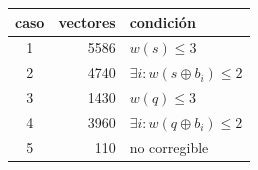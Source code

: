\begin{tabular}{@{}crl@{}}
\toprule
caso & vectores & condición \\
\midrule
1 & 5586 & $w(s)\le 3$ \\
2 & 4740 & $\exists i: w(s\oplus b_i)\le 2$ \\
3 & 1430 & $w(q)\le 3$ \\
4 & 3960 & $\exists i: w(q\oplus b_i)\le 2$ \\
5 & 110 & no corregible \\
\bottomrule
\end{tabular}
